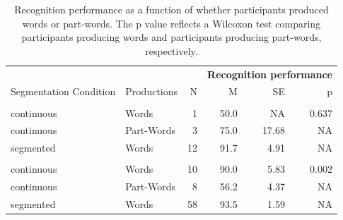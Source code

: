 \documentclass[
]{article}
\begin{document}
\begin{longtable}[t]{llrrrr}
\caption{\label{tab:correlation-recognition-vs-recall-discrete-print}Recognition performance as a function of whether participants produced words or part-words. The p value reflects a Wilcoxon test comparing participants producing words and participants producing part-words, respectively.}\\
\toprule
\multicolumn{3}{c}{\textbf{ }} & \multicolumn{3}{c}{\textbf{Recognition performance}} \\
\cmidrule(l{3pt}r{3pt}){4-6}
Segmentation Condition & Productions & N & M & SE & p\\
\midrule
\addlinespace[0.3em]
\multicolumn{6}{l}{\textbf{lab-based}}\\
\hspace{1em}continuous & Words & 1 & 50.0 & NA & 0.637\\
\hspace{1em}continuous & Part-Words & 3 & 75.0 & 17.68 & NA\\
\hspace{1em}segmented & Words & 12 & 91.7 & 4.91 & NA\\
\addlinespace[0.3em]
\multicolumn{6}{l}{\textbf{online}}\\
\hspace{1em}continuous & Words & 10 & 90.0 & 5.83 & 0.002\\
\hspace{1em}continuous & Part-Words & 8 & 56.2 & 4.37 & NA\\
\hspace{1em}segmented & Words & 58 & 93.5 & 1.59 & NA\\
\bottomrule
\end{longtable}
\end{document}
